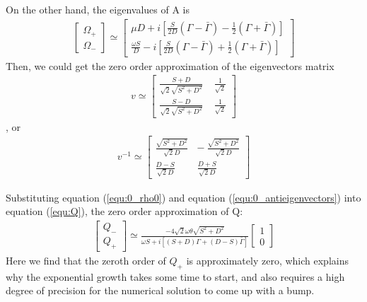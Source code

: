 \documentclass[aps,prd,twocolumn,amsmath,amssymb,groupedaddress]{revtex4-2}
\begin{document}
On the other hand, the eigenvalues of A is
\begin{eqnarray}
	\begin{bmatrix}
		\Omega_+ \\ \Omega_-
	\end{bmatrix} \simeq
	\begin{bmatrix}
		\mu D + i \left[\frac{S}{2D}\left(\Gamma-\bar{\Gamma}\right)-\frac{1}{2}\left(\Gamma+\bar{\Gamma}\right)\right]\\
		\frac{\omega S}{D} - i \left[\frac{S}{2D}\left(\Gamma-\bar{\Gamma}\right)+\frac{1}{2}\left(\Gamma+\bar{\Gamma}\right)\right]
	\end{bmatrix}
\end{eqnarray}
Then, we could get the zero order approximation of the eigenvectors matrix 
\begin{eqnarray}
	\label{equ:0_eigenvectors}
	v \simeq
	\begin{bmatrix}
		\frac{S+D}{\sqrt{2}\sqrt{S^2+D^2}} ~~~~~ \frac{1}{\sqrt{2}}\\
		\frac{S-D}{\sqrt{2}\sqrt{S^2+D^2}} ~~~~~ \frac{1}{\sqrt{2}}
	\end{bmatrix}
\end{eqnarray}, or
\begin{eqnarray}
	\label{equ:0_antieigenvectors}
	v^{-1}\simeq
	\begin{bmatrix}
		\frac{\sqrt{S^2+D^2}}{\sqrt{2}D} ~~~ -\frac{\sqrt{S^2+D^2}}{\sqrt{2}D}\\
		\frac{D-S}{\sqrt{2}D} ~~~~~~~~~~ \frac{D+S}{\sqrt{2}D}
	\end{bmatrix}
\end{eqnarray}

Substituting equation (\ref{equ:0_rho0}) and equation (\ref{equ:0_antieigenvectors}) into equation (\ref{equ:Q}), the zero order approximation of Q:
\begin{eqnarray}
	\label{equ:0_Q}
	\begin{bmatrix}
		Q_- \\ Q_+
	\end{bmatrix} \simeq \frac{-4\sqrt{2}\omega \theta \sqrt{S^2+D^2}}{\omega S + i\left[(S+D) \Gamma + (D-S) \bar{\Gamma}\right]}
	\begin{bmatrix}
	1 \\ 0
	\end{bmatrix}
\end{eqnarray}
Here we find that the zeroth order of $Q_+$ is approximately zero, which explains why the exponential growth takes some time to start, and also requires a high degree of precision for the numerical solution to come up with a bump.
\end{document}
